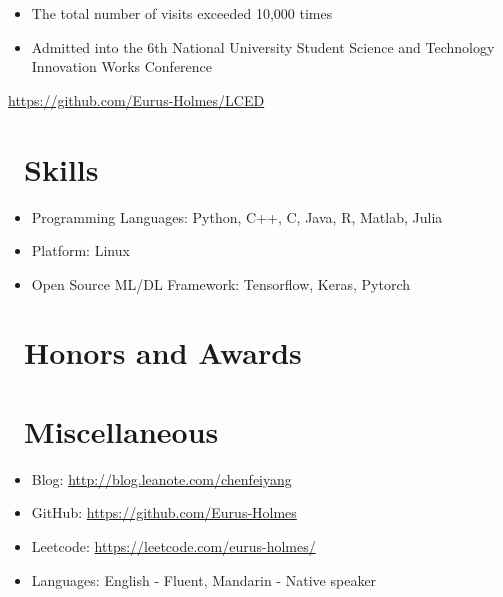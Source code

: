 \documentclass{resume}
\begin{document}
\begin{itemize}
  \item The total number of visits exceeded 10,000 times
  \item Admitted into the 6th National University Student Science and Technology Innovation Works Conference
\end{itemize}

\url{https://github.com/Eurus-Holmes/LCED}




\section{\faCogs\ Skills}
\begin{itemize}[parsep=0.5ex]
  \item Programming Languages: Python, C++, C, Java, R, Matlab, Julia
  \item Platform: Linux
  \item Open Source ML/DL Framework: Tensorflow, Keras, Pytorch
\end{itemize}

\section{\faHeartO\ Honors and Awards}


\section{\faInfo\ Miscellaneous}
\begin{itemize}[parsep=0.5ex]
  \item Blog: \url{http://blog.leanote.com/chenfeiyang}
  \item GitHub: \url{https://github.com/Eurus-Holmes}
  \item Leetcode: \url{https://leetcode.com/eurus-holmes/}
  \item Languages: English - Fluent, Mandarin - Native speaker
\end{itemize}

%
%
\end{document}
